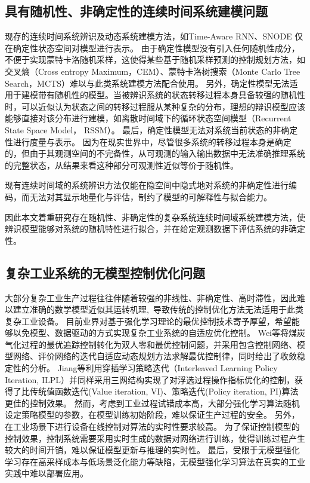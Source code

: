 \subsection{具有随机性、非确定性的连续时间系统建模问题}
现存的连续时间系统辨识及动态系统建模方法，如Time-Aware RNN\cite{Demeester2019}、SNODE\cite{Quaglino2019} 仅在确定性状态空间对模型进行表示。
由于确定性模型没有引入任何随机性成分，不便于实现蒙特卡洛随机采样，这使得某些基于随机采样预测的控制规划方法，如交叉熵（Cross entropy Maximum，CEM）、蒙特卡洛树搜索（Monte Carlo Tree Search，MCTS）难以与此类系统建模方法配合使用。
另外，确定性模型无法适用于建模带有随机性的模型。当被辨识系统的状态转移过程本身具备较强的随机性时，可以近似认为状态之间的转移过程服从某种复杂的分布，理想的辩识模型应该能够直接对该分布进行建模，如离散时间域下的循环状态空间模型\cite{Hafner2019}（Recurrent State Space Model， RSSM）。
最后，确定性模型无法对系统当前状态的非确定性进行度量与表示。
因为在现实世界中，尽管很多系统的转移过程本身是确定的，但由于其观测空间的不完备性，从可观测的输入输出数据中无法准确推理系统的完整状态，从结果来看这种部分可观测性近似等价于随机性。

现有连续时间域的系统辨识方法仅能在隐空间中隐式地对系统的非确定性进行编码，而无法对其显示地量化与评估，制约了模型的可解释性与拟合能力。

因此本文着重研究存在随机性、非确定性的复杂系统连续时间域系统建模方法，使辨识模型能够对系统的随机特性进行拟合，并在给定观测数据下评估系统的非确定性。

\subsection{复杂工业系统的无模型控制优化问题}
大部分复杂工业生产过程往往伴随着较强的非线性、非确定性、高时滞性，因此难以建立准确的数学模型近似其运转机理, 导致传统的控制优化方法无法适用于此类复杂工业设备。
目前业界对基于强化学习理论的最优控制技术\cite{Sutton2018,F.L.LewisD.Vrabie2012}寄予厚望，希望能够以免模型、数据驱动的方式实现复杂工业系统的自适应优化控制。
Wei等\cite{Wei2014}将煤炭气化过程的最优追踪控制转化为双人零和最优控制问题，并采用包含控制网络、模型网络、评价网络的迭代自适应动态规划方法求解最优控制律，同时给出了收敛稳定性的分析。
Jiang等\cite{Jiang2018}利用穿插学习策略迭代（Interleaved Learning
Policy Iteration, ILPL）并同样采用三网结构实现了对浮选过程操作指标优化的控制，获得了比传统值函数迭代(Value iteration, VI)、策略迭代(Policy iteration, PI)算法更佳的控制效果。
然而，考虑到工业过程试错成本高，大部分强化学习算法随机设定策略模型的参数，在模型训练初始阶段，难以保证生产过程的安全。
另外，在工业场景下进行设备在线控制对算法的实时性要求较高。
为了保证控制模型的控制效果，控制系统需要采用实时生成的数据对网络进行训练，使得训练过程产生较大的时间开销，难以保证模型更新与推理的实时性。
最后，受限于无模型强化学习存在高采样成本与低场景泛化能力等缺陷，无模型强化学习算法在真实的工业实践中难以部署应用。

